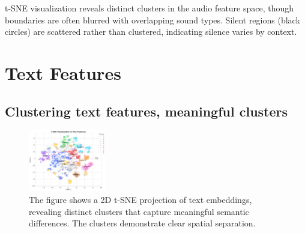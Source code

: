 \documentclass{article}
\begin{document}
t-SNE visualization reveals distinct clusters in the audio feature space, though boundaries are often blurred with overlapping sound types. Silent regions (black circles) are scattered rather than clustered, indicating silence varies by context.

\section{Text Features}
\label{sec:text_features}
\subsection{Clustering text features, meaningful clusters}
\begin{figure}[H]
  \centering
  \includegraphics[width=0.3\textwidth]{figures/text_features/text_features_clusters_tsne_10.png}
  \caption{The figure shows a 2D t-SNE projection of text embeddings, revealing distinct clusters that capture meaningful semantic differences. The clusters demonstrate clear spatial separation.}
  \label{fig:text_feat_1}
\end{figure}
\end{document}
